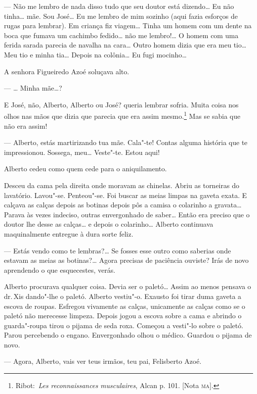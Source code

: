 --- Não me lembro de nada disso tudo que seu doutor está dizendo\ldots{} Eu
não tinha\ldots{} mãe. Sou José\ldots{} Eu me lembro de mim sozinho (aqui fazia
esforços de rugas para lembrar). Em criança fiz viagem\ldots{} Tinha um homem
com um dente na boca que fumava um cachimbo fedido\ldots{} não me lembro!\ldots{}
O homem com uma ferida sarada parecia de navalha na cara\ldots{} Outro homem
dizia que era meu tio\ldots{} Meu tio e minha tia\ldots{} Depois na colônia\ldots{} Eu
fugi mocinho\ldots{}

A senhora Figueiredo Azoé soluçava alto.

--- \ldots{} Minha mãe\ldots{}?

E José, não, Alberto, Alberto ou José? queria lembrar sofria. Muita
coisa nos olhos nas mãos que dizia que parecia que era assim
mesmo.\footnote{Ribot:~\emph{Les reconnaissances musculaires}, Alcan p.
  101. {[}Nota \textsc{ma}{]}.} Mas se sabia que não era assim!

--- Alberto, estás martirizando tua mãe. Cala"-te! Contas alguma história
que te impressionou. Sossega, meu\ldots{} Veste"-te. Estou aqui!

Alberto cedeu como quem cede para o aniquilamento.

Desceu da cama pela direita onde moravam as chinelas. Abriu as torneiras
do lavatório. Lavou"-se. Penteou"-se. Foi buscar as meias limpas na gaveta
exata. E calçava as calças depois as botinas depois pôs a camisa o
colarinho a gravata\ldots{} Parava às vezes indeciso, outras envergonhado de
saber\ldots{} Então era preciso que o doutor lhe desse as calças\ldots{} e depois
o colarinho\ldots{} Alberto continuava maquinalmente entregue à dura sorte
feliz.

--- Estás vendo como te lembras?\ldots{} Se fosses esse outro como saberias
onde estavam as meias as botinas?\ldots{} Agora precisas de paciência
ouviste? Irás de novo aprendendo o que esquecestes, verás.

Alberto procurava qualquer coisa. Devia ser o paletó\ldots{} Assim ao menos
pensava o dr.\,Xis dando"-lhe o paletó. Alberto vestiu"-o. Exausto foi
tirar duma gaveta a escova de roupas. Esfregou vivamente as calças,
unicamente as calças como se o paletó não merecesse limpeza. Depois
jogou a escova sobre a cama e abrindo o guarda"-roupa tirou o pijama de
seda roxa. Começou a vesti"-lo sobre o paletó. Parou percebendo o engano.
Envergonhado olhou o médico. Guardou o pijama de novo.

--- Agora, Alberto, vais ver teus irmãos, teu pai, Felisberto Azoé.

